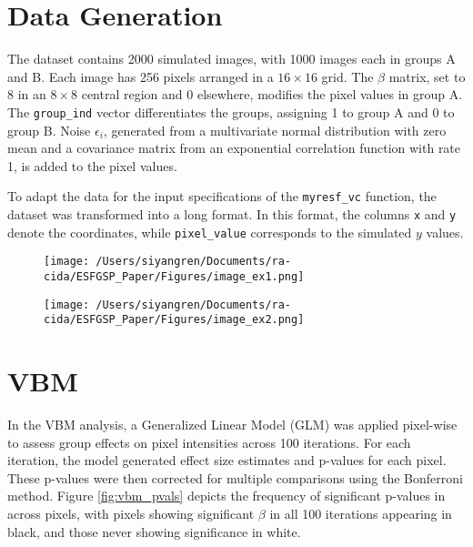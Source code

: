 \documentclass[12pt]{article}
\begin{document}
\section*{Data Generation}

The dataset contains 2000 simulated images, with 1000 images each in groups A and B. Each image has 256 pixels arranged in a \(16 \times 16\) grid. The \(\beta\) matrix, set to 8 in an \(8 \times 8\) central region and 0 elsewhere, modifies the pixel values in group A. The \texttt{group\_ind} vector differentiates the groups, assigning 1 to group A and 0 to group B. Noise \(\epsilon_i\), generated from a multivariate normal distribution with zero mean and a covariance matrix from an exponential correlation function with rate 1, is added to the pixel values.

To adapt the data for the input specifications of the \texttt{myresf\_vc} function, the dataset was transformed into a long format. In this format, the columns \texttt{x} and \texttt{y} denote the coordinates, while \texttt{pixel\_value} corresponds to the simulated $y$ values.

\begin{figure}[H]
    \centering
    \begin{minipage}[b]{0.45\textwidth}
        \texttt{[image: /Users/siyangren/Documents/ra-cida/ESFGSP\_Paper/Figures/image\_ex1.png]}
    \end{minipage}
    \hfill %
    \begin{minipage}[b]{0.45\textwidth}
        \texttt{[image: /Users/siyangren/Documents/ra-cida/ESFGSP\_Paper/Figures/image\_ex2.png]}
    \end{minipage}
\end{figure}

\section*{VBM}

In the VBM analysis, a Generalized Linear Model (GLM) was applied pixel-wise to assess group effects on pixel intensities across 100 iterations. For each iteration, the model generated effect size estimates and p-values for each pixel. These p-values were then corrected for multiple comparisons using the Bonferroni method. Figure \ref{fig:vbm_pvals} depicts the frequency of significant p-values in across pixels, with pixels showing significant \(\beta\) in all 100 iterations appearing in black, and those never showing significance in white.
\end{document}

